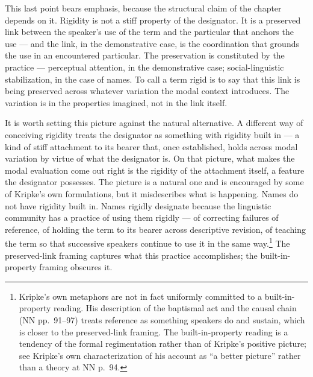 \documentclass[12pt,a4paper]{article}
\begin{document}
This last point bears emphasis, because the structural claim of the chapter depends on it. Rigidity is not a stiff property of the designator. It is a preserved link between the speaker's use of the term and the particular that anchors the use --- and the link, in the demonstrative case, is the coordination that grounds the use in an encountered particular. The preservation is constituted by the practice --- perceptual attention, in the demonstrative case; social-linguistic stabilization, in the case of names. To call a term rigid is to say that this link is being preserved across whatever variation the modal context introduces. The variation is in the properties imagined, not in the link itself.

It is worth setting this picture against the natural alternative. A different way of conceiving rigidity treats the designator as something with rigidity built in --- a kind of stiff attachment to its bearer that, once established, holds across modal variation by virtue of what the designator is. On that picture, what makes the modal evaluation come out right is the rigidity of the attachment itself, a feature the designator possesses. The picture is a natural one and is encouraged by some of Kripke's own formulations, but it misdescribes what is happening. Names do not have rigidity built in. Names rigidly designate because the linguistic community has a practice of using them rigidly --- of correcting failures of reference, of holding the term to its bearer across descriptive revision, of teaching the term so that successive speakers continue to use it in the same way.\footnote{Kripke's own metaphors are not in fact uniformly committed to a built-in-property reading. His description of the baptismal act and the causal chain (NN pp.~91--97) treats reference as something speakers do and sustain, which is closer to the preserved-link framing. The built-in-property reading is a tendency of the formal regimentation rather than of Kripke's positive picture; see Kripke's own characterization of his account as ``a better picture'' rather than a theory at NN p.~94.} The preserved-link framing captures what this practice accomplishes; the built-in-property framing obscures it.
\end{document}
